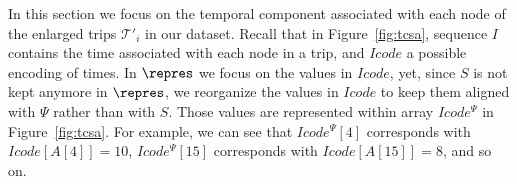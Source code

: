 



In this section we focus on the temporal component associated with each node of the enlarged trips $\mathcal{T}'_i$ 
in our dataset. Recall that in Figure~\ref{fig:tcsa}, sequence $I$ contains the time
associated with each node in a trip, and $Icode$ a possible encoding of times. 
In $\repres$ we focus on the values in $Icode$, yet, since $S$ is not kept anymore in $\repres$, we 
reorganize the values in $Icode$ to keep them aligned with $\Psi$ rather than with $S$. Those
values are represented within array $Icode^{\Psi}$ in Figure~\ref{fig:tcsa}. 
For example, we can see that $Icode^{\Psi}[4]$ corresponds with $Icode[A[4]]=10$, 
$Icode^{\Psi}[15]$ corresponds with $Icode[A[15]]=8$, and so on.

